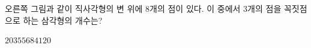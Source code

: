\hspace*{2mm}\begin{minipage}[t]{\dimexpr\linewidth-2mm\relax}\vspace{0pt}
\noindent\begin{minipage}[t]{0.58\linewidth}\vspace{0pt}\raggedright 오른쪽 그림과 같이 직사각형의 변 위에 $8$개의 점이 있다. 이 중에서 $3$개의 점을 꼭짓점으로 하는 삼각형의 개수는?\end{minipage}\hfill\begin{minipage}[t]{0.4\linewidth}\vspace{0pt}\centering \resizebox{\ifdim\width>\linewidth\linewidth\else\width\fi}{!}{}\end{minipage}\par
\begin{choices32}{$20$}{$35$}{$56$}{$84$}{$120$}\end{choices32}\end{minipage}
